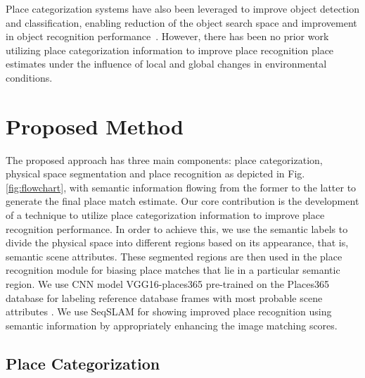 \documentclass[letterpaper, 10 pt, conference]{ieeeconf}  %
\begin{document}
Place categorization systems have also been leveraged to improve object detection and classification, enabling reduction of the object search space and improvement in object recognition performance~\cite{torralba2003context}. However, there has been no prior work utilizing place categorization information to improve place recognition place estimates under the influence of local and global changes in environmental conditions. 

\section{Proposed Method}
The proposed approach has three main components: place categorization, physical space segmentation and place recognition as depicted in Fig. \ref{fig:flowchart}, with semantic information flowing from the former to the latter to generate the final place match estimate. Our core contribution is the development of a technique to utilize place categorization information to improve place recognition performance. In order to achieve this, we use the semantic labels to divide the physical space into different regions based on its appearance, that is, semantic scene attributes. These segmented regions are then used in the place recognition module for biasing place matches that lie in a particular semantic region. We use CNN model VGG16-places365 \cite{cnnPlaces365Github} pre-trained on the Places365 database \cite{zhou2014learning} for labeling reference database frames with most probable scene attributes \cite{Patterson2012SunAttributes}. We use SeqSLAM \cite{Milford2012} for showing improved place recognition using semantic information by appropriately enhancing the image matching scores.

\subsection{Place Categorization}
\end{document}
